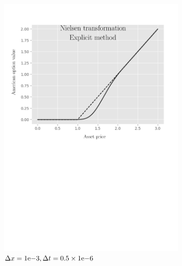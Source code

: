 \begin{figure}[tbp]
\begin{subfigure}{0.4\textwidth}
    \includegraphics[width=\textwidth]{chapters/chapter3/TestCase1ExplicitNielsen.pdf}
    \caption{$\Delta{x}={1}\mathrm{e}{-3}, \Delta{t}=0.5\times{1}\mathrm{e}{-6}$}
    \label{fig:finitedifferencesschemes:numericaresults:test_case_1_explicit_nielsen}
  \end{subfigure}
  \hspace{0.5cm}
  \begin{subfigure}{0.4\textwidth}
    \centering

\end{subfigure}
\end{figure}
